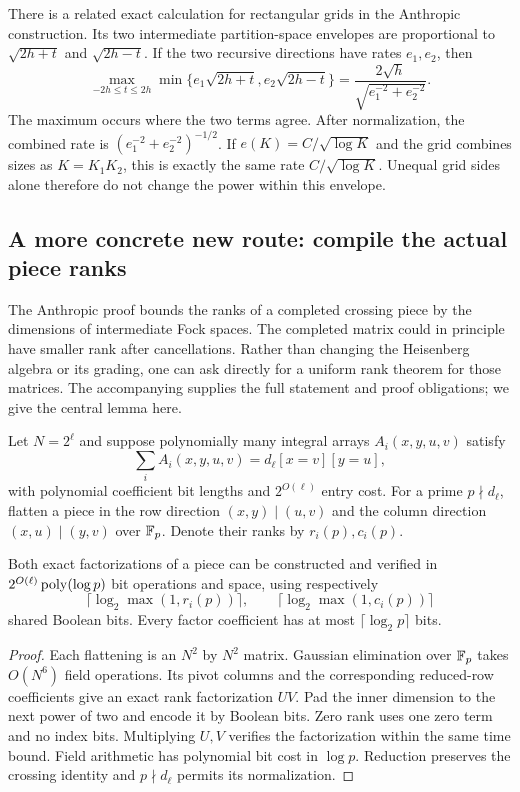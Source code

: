 There is a related exact calculation for rectangular grids in the
Anthropic construction. Its two intermediate partition-space envelopes
are proportional to $\sqrt{2h+t}$ and $\sqrt{2h-t}$. If the two recursive
directions have rates $e_1,e_2$, then
\[
 \max_{-2h\le t\le2h}
 \min\{e_1\sqrt{2h+t},e_2\sqrt{2h-t}\}
 =\frac{2\sqrt h}{\sqrt{e_1^{-2}+e_2^{-2}}}.
\]
The maximum occurs where the two terms agree. After normalization, the
combined rate is $(e_1^{-2}+e_2^{-2})^{-1/2}$. If
$e(K)=C/\sqrt{\log K}$ and the grid combines sizes as
$K=K_1K_2$, this is exactly the same rate $C/\sqrt{\log K}$. Unequal
grid sides alone therefore do not change the power within this envelope.

\subsection{A more concrete new route: compile the actual piece ranks}

The Anthropic proof bounds the ranks of a completed crossing piece by the
dimensions of intermediate Fock spaces. The completed matrix could in
principle have smaller rank after cancellations. Rather than changing the
Heisenberg algebra or its grading, one can ask directly for a uniform
rank theorem for those matrices. The accompanying
 supplies the full statement and
proof obligations; we give the central lemma here.

Let $N=2^\ell$ and suppose polynomially many integral arrays
$A_i(x,y,u,v)$ satisfy
\[
 \sum_i A_i(x,y,u,v)=d_\ell[x=v][y=u],
\]
with polynomial coefficient bit lengths and $2^{O(\ell)}$ entry cost.
For a prime $p\nmid d_\ell$, flatten a piece in the row direction
$(x,y)\mid(u,v)$ and the column direction $(x,u)\mid(y,v)$ over $\mathbb F_p$.
Denote their ranks by $r_i(p),c_i(p)$.

\begin{lemma}\label{lem:modrank}
Both exact factorizations of a piece can be constructed and verified in
$2^{O(\ell)}\operatorname{poly}(\log p)$ bit operations and space, using respectively
\[
 \lceil\log_2\max(1,r_i(p))\rceil,
 \qquad \lceil\log_2\max(1,c_i(p))\rceil
\]
shared Boolean bits. Every factor coefficient has at most
$\lceil\log_2p\rceil$ bits.
\end{lemma}
\begin{proof}
Each flattening is an $N^2$ by $N^2$ matrix. Gaussian elimination over
$\mathbb F_p$ takes $O(N^6)$ field operations. Its pivot columns and the
corresponding reduced-row coefficients give an exact rank factorization
$UV$. Pad the inner dimension to the next power of two and encode it by
Boolean bits. Zero rank uses one zero term and no index bits. Multiplying
$U,V$ verifies the factorization within the same time bound. Field
arithmetic has polynomial bit cost in $\log p$. Reduction preserves the
crossing identity and $p\nmid d_\ell$ permits its normalization.
\end{proof}

